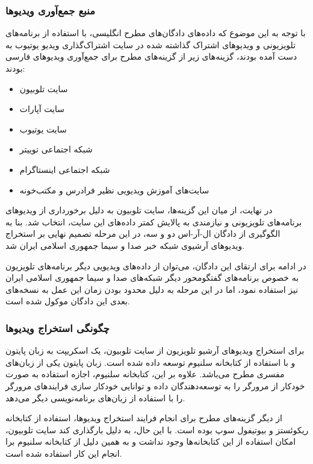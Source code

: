 \subsubsection{منبع جمع‌آوری ویدیو‌ها}

با توجه به این موضوع که داده‌های دادگان‌های مطرح انگلیسی، با استفاده از برنامه‌های تلویزیونی و ویدیو‌های اشتراک گذاشته شده در سایت اشتراک‌گذاری ویدیو یوتیوب به دست آمده بودند، گزینه‌های زیر از گزینه‌های مطرح برای جمع‌آوری ویدیو‌های فارسی بودند:

\begin{itemize}
	\item سایت تلوبیون
	\item سایت آپارات
	\item سایت یوتیوب
	\item شبکه اجتماعی توییتر
	\item شبکه اجتماعی اینستاگرام
	\item سایت‌های آموزش ویدیویی نظیر فرادرس و مکتب‌خونه
\end{itemize}

در نهایت، از میان این گزینه‌ها، سایت تلوبیون به دلیل برخورداری از ویدیو‌های برنامه‌های تلویزیونی و نیازمندی به پالایش کمتر داده‌های این سایت، انتخاب شد. بنا به الگوگیری از دادگان ال-آر-اس دو و سه، در این مرحله تصمیم نهایی بر استخراج ویدیو‌های آرشیوی شبکه خبر صدا و سیما جمهوری اسلامی ایران شد.

در ادامه برای ارتقای این دادگان، می‌توان از داده‌های ویدیویی دیگر برنامه‌های تلویزیون به خصوص برنامه‌های گفتگومحور دیگر شبکه‌های صدا و سیما جمهوری اسلامی ایران نیز استفاده نمود، اما در این مرحله به دلیل محدود بودن زمان این عمل به نسخه‌های بعدی این دادگان موکول شده است.

\subsubsection{چگونگی استخراج ویدیو‌ها}

برای استخراج ویدیو‌های آرشیو تلویزیون از سایت تلوبیون، یک اسکریپت به زبان پایتون
و با استفاده از کتابخانه سلنیوم
توسعه داده شده است. زبان پایتون یکی از زبان‌های مفسری
مطرح می‌باشد. علاوه بر این، کتابخانه سلنیوم، اجازه استفاده به صورت خودکار از مرورگر را به توسعه‌دهندگان داده و توانایی خودکار سازی فرایند‌های مرورگر را با استفاده از زبان‌های برنامه‌نویسی دیگر می‌دهد.

از دیگر گزینه‌های مطرح برای انجام فرایند استخراج ویدیو‌ها، استفاده از کتابخانه ریکوئستز
و بیوتیفول سوپ
بوده است. با این حال، به دلیل بارگذاری کند
سایت تلوبیون، امکان استفاده از این کتابخانه‌ها وجود نداشت و به همین دلیل از کتابخانه سلنیوم برا انجام این کار استفاده شده است.

